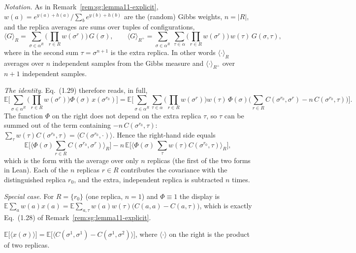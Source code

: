 \begin{remark}\label{rem:sg:replica-explicit}
\emph{Notation.} As in Remark~\ref{rem:sg:lemma11-explicit}, $w(a)=e^{y(a)+h(a)}/\sum_be^{y(b)+h(b)}$ are the (random) Gibbs weights, $n=|R|$, and the replica averages are sums over tuples of configurations,
\[\langle G\rangle_R=\sum_{\sigma\in\alpha^R}\Big(\prod_{r\in R}w(\sigma^r)\Big)\,G(\sigma),\qquad
\langle G\rangle_{R^+}=\sum_{\sigma\in\alpha^R}\ \sum_{\tau\in\alpha}\Big(\prod_{r\in R}w(\sigma^r)\Big)\,w(\tau)\,G(\sigma,\tau),\]
where in the second sum $\tau=\sigma^{n+1}$ is the extra replica. In other words $\langle\cdot\rangle_R$ averages over $n$ independent samples from the Gibbs measure and $\langle\cdot\rangle_{R^+}$ over $n+1$ independent samples.

\emph{The identity.} Eq.~(1.29) therefore reads, in full,
\[\mathbb E\Big[\sum_{\sigma\in\alpha^R}\Big(\prod_{r\in R}w(\sigma^r)\Big)\Phi(\sigma)\,x(\sigma^{r_0})\Big]
=\mathbb E\Big[\sum_{\sigma\in\alpha^R}\sum_{\tau\in\alpha}\Big(\prod_{r\in R}w(\sigma^r)\Big)w(\tau)\,\Phi(\sigma)\Big(\sum_{r\in R}C(\sigma^{r_0},\sigma^r)-n\,C(\sigma^{r_0},\tau)\Big)\Big].\]
The function $\Phi$ on the right does not depend on the extra replica $\tau$, so $\tau$ can be summed out of the term containing $-n\,C(\sigma^{r_0},\tau)$:
$\sum_\tau w(\tau)C(\sigma^{r_0},\tau)=\langle C(\sigma^{r_0},\cdot)\rangle$. Hence the right-hand side equals
\[\mathbb E\Big[\Big\langle\Phi(\sigma)\sum_{r\in R}C(\sigma^{r_0},\sigma^r)\Big\rangle_R\Big]-n\,\mathbb E\Big[\Big\langle\Phi(\sigma)\ \sum_{\tau}w(\tau)C(\sigma^{r_0},\tau)\Big\rangle_R\Big],\]
which is the form with the average over only $n$ replicas (the first of the two forms in Lean). Each of the $n$ replicas $r\in R$ contributes the covariance with the distinguished replica $r_0$, and the extra, independent replica is subtracted $n$ times.

\emph{Special case.} For $R=\{r_0\}$ (one replica, $n=1$) and $\Phi\equiv1$ the display is $\mathbb E\sum_aw(a)x(a)=\mathbb E\sum_{a,\tau}w(a)w(\tau)\big(C(a,a)-C(a,\tau)\big)$, which is exactly Eq.~(1.28) of Remark~\ref{rem:sg:lemma11-explicit}.
\end{remark}

\begin{theorem}\label{thm:sg:lemma11}
  \leanok
$\mathbb E\big[\langle x(\sigma)\rangle\big]=\mathbb E\big[\langle C(\sigma^1,\sigma^1)-C(\sigma^1,\sigma^2)\rangle\big]$, where $\langle\cdot\rangle$ on the right
is the product of two replicas.
\end{theorem}

